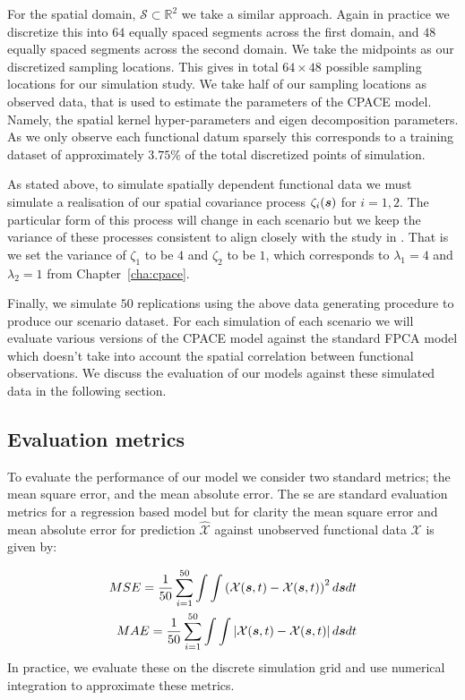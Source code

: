 For the spatial domain, $\mathcal{S} \subset \mathbb{R}^2$ we take a similar approach.
Again in practice we discretize this into $64$ equally spaced segments across the first domain, and $48$ equally spaced segments across the second domain.
We take the midpoints as our discretized sampling locations.
This gives in total $64 \times 48$ possible sampling locations for our simulation study.
We take half of our sampling locations as observed data, that is used to estimate the parameters of the CPACE model.
Namely, the spatial kernel hyper-parameters and eigen decomposition parameters.
As we only observe each functional datum sparsely this corresponds to a training dataset of approximately $3.75\%$ of the total discretized points of simulation.

As stated above, to simulate spatially dependent functional data we must simulate a realisation of our spatial covariance process $\zeta_i(\bm{{s}})$ for $i=1,2$. 
The particular form of this process will change in each scenario but we keep the variance of these processes consistent to align closely with the study in \citep{yao_functional_2005}.
That is we set the variance of $\zeta_1$ to be $4$ and $\zeta_2$ to be $1$, which corresponds to $\lambda_1 = 4$ and $\lambda_2=1$ from Chapter~\ref{cha:cpace}.

Finally, we simulate $50$ replications using the above data generating procedure to produce our scenario dataset.
For each simulation of each scenario we will evaluate various versions of the CPACE model against the standard FPCA model which doesn't take into account the spatial correlation between functional observations.
We discuss the evaluation of our models against these simulated data in the following section. 

\subsection{Evaluation metrics \label{ssec:eval_metrics}}
To evaluate the performance of our model we consider two standard metrics; the mean square error, and the mean absolute error.
The se are standard evaluation metrics for a regression based model but for clarity the mean square error and mean absolute error for prediction $\hat{\mathcal{X}}$ against unobserved functional data $\mathcal{X}$ is given by:

\begin{eqnarray}
	MSE = \frac{1}{50} \sum_{i=1}^{50} \int \int \left( \mathcal{X}(\bm{{s}}, t) - \mathcal{X}(\bm{{s}}, t) \right)^2 d\bm{{s}} dt \nonumber \\
	MAE = \frac{1}{50} \sum_{i=1}^{50} \int \int \left| \mathcal{X}(\bm{{s}}, t) - \mathcal{X}(\bm{{s}}, t) \right| d\bm{{s}} dt \nonumber
\end{eqnarray}
In practice, we evaluate these on the discrete simulation grid and use numerical integration to approximate these metrics.

